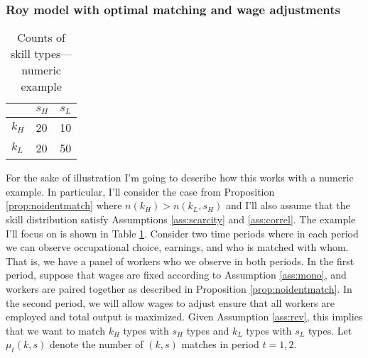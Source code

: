 \documentclass[12 pt]{article}
\begin{document}
\subsubsection{Roy model with optimal matching and wage adjustments}
\begin{table}[H]
	\centering
	\begin{tabular}{l|ll}
		& $s_H$        & $s_L$        \\ \hline
		$k_H$ & 20 & 10 \\
		$k_L$ & 20 & 50
		
	\end{tabular}
	\caption{Counts of skill types---numeric example}
	\label{tab:2by2countsex}
\end{table}
For the sake of illustration I'm going to describe how this works with a numeric example. In particular, I'll consider the case from Proposition \ref{prop:noidentmatch} where $n(k_H) > n(k_L,s_H)$ and I'll also assume that the skill distribution satisfy Assumptions \ref{ass:scarcity} and \ref{ass:correl}. The example I'll focus on is shown in Table \ref{tab:2by2countsex}. Consider two time periods where in each period we can observe occupational choice, earnings, and who is matched with whom. That is, we have a panel of workers who we observe in both periods. In the first period, suppose that wages are fixed according to Assumption \ref{ass:mono}, and workers are paired together as described in Proposition \ref{prop:noidentmatch}. In the second period, we will allow wages to adjust ensure that all workers are employed and total output is maximized. Given Assumption \ref{ass:rev}, this implies that we want to match $k_H$ types with $s_H$ types and $k_L$ types with $s_L$ types. Let $\mu_t(k,s)$ denote the number of $(k,s)$ matches in period $t=1,2$. 
\end{document}
